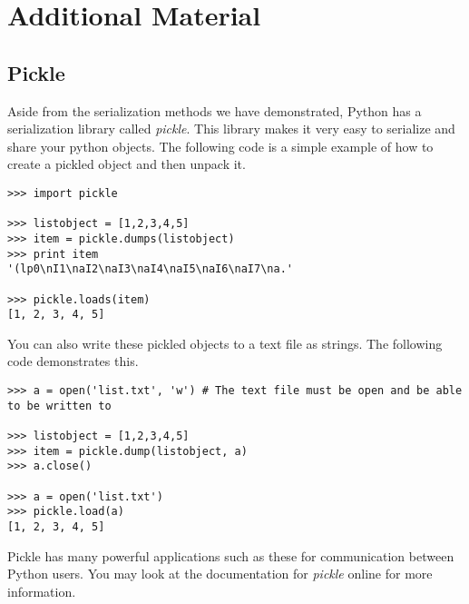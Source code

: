 \newpage

\section*{Additional Material} 


\subsection*{Pickle} 
Aside from the serialization methods we have demonstrated, Python has a serialization library called \emph{pickle}.
This library makes it very easy to serialize and share your python objects.
The following code is a simple example of how to create a pickled object and then unpack it.
\begin{lstlisting}
>>> import pickle

>>> listobject = [1,2,3,4,5]
>>> item = pickle.dumps(listobject)
>>> print item
'(lp0\nI1\naI2\naI3\naI4\naI5\naI6\naI7\na.'

>>> pickle.loads(item)
[1, 2, 3, 4, 5]
\end{lstlisting}

You can also write these pickled objects to a text file as strings. The following code demonstrates this.
\begin{lstlisting}
>>> a = open('list.txt', 'w') # The text file must be open and be able to be written to

>>> listobject = [1,2,3,4,5]
>>> item = pickle.dump(listobject, a)
>>> a.close()

>>> a = open('list.txt')
>>> pickle.load(a)
[1, 2, 3, 4, 5]
\end{lstlisting}

Pickle has many powerful applications such as these for communication between Python users.
You may look at the documentation for \emph{pickle} online for more information.
